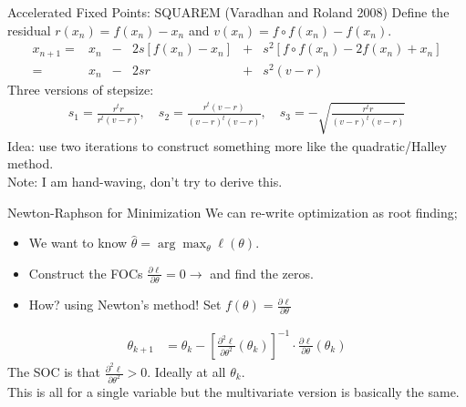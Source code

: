 \documentclass[xcolor=pdftex,dvipsnames,table,mathserif,aspectratio=169]{beamer}
\begin{document}
\begin{frame}{Accelerated Fixed Points: SQUAREM (Varadhan and Roland 2008)}
Define the residual $r(x_n) = f(x_n) - x_n$ and $v(x_n)=f \circ f \left(x_{n}\right)-f\left(x_{n}\right)$.
\begin{align*}
x_{n+1}=& x_{n}&-&2 s\left[f\left(x_{n}\right)-x_{n}\right] &+&s^{2}\left[f \circ f\left(x_{n}\right)-2 f\left(x_{n}\right)+x_{n}\right] \\
=& x_{n}&-&2 s r &+&s^{2}(v-r)
\end{align*}
Three versions of stepsize:
\begin{align*}
s_1 =\frac{r^{t} r}{r^{t}(v-r)}, \quad
s_2 =\frac{r^{t}(v-r)}{(v-r)^{t}(v-r)}, \quad
s_3 =-\sqrt{\frac{r^{t} r}{(v-r)^{t}(v-r)}}
\end{align*}
Idea: use two iterations to construct something more like the quadratic/Halley method.\\
\alert{Note: I am hand-waving, don't try to derive this.}
\end{frame}






\begin{frame}{Newton-Raphson for Minimization}
We can re-write \alert{optimization} as \alert{root finding};
\begin{itemize}
\item We want to know $\hat{\theta} = \arg \max_{\theta} \ell(\theta)$.
\item Construct the FOCs $\frac{\partial \ell}{\partial \theta}=0 \rightarrow$  and find the zeros.
\item How? using Newton's method! Set $f(\theta) = \frac{\partial \ell}{\partial \theta}$
\end{itemize}
\begin{align*}
\theta_{k+1} &= \theta_k -  \left[ \frac{\partial^2 \ell}{\partial \theta^2}(\theta_k) \right]^{-1} \cdot \frac{\partial \ell}{\partial \theta}(\theta_k)
\end{align*}
The SOC is that $ \frac{\partial^2 \ell}{\partial \theta^2} >0$. Ideally at all $\theta_k$.\\
This is all for a \alert{single variable} but the \alert{multivariate} version is basically the same.
\end{frame}
\end{document}
